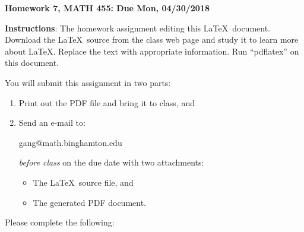 \documentclass[11pt]{article}
\begin{document}
\begin{title}
	{\Large\bf Homework 7, MATH 455: Due Mon, 04/30/2018}
\end{title}

\author{\bf Alexander Van Roijen}

\maketitle
{\bf Instructions}:  The homework assignment editing this \LaTeX\ document.  Download the \LaTeX\ source from the class web page and study
it to learn more about \LaTeX.  Replace the text with appropriate information.  Run ``pdflatex'' on this document.

You will submit this assignment in two parts:
\begin{enumerate}
\item Print out the PDF file and bring it to class, and
\item Send an e-mail to:
\begin{center}
gang@math.binghamton.edu
\end{center}
\emph{before class} on the due date with two attachments:
\begin{itemize}
\item The \LaTeX\ source file, and
\item The generated PDF document.
\end{itemize}
\end{enumerate}
\newpage
Please complete the following:
\end{document}
